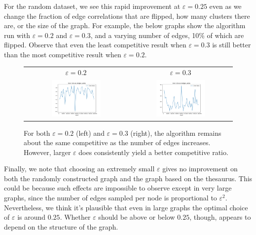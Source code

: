 \documentclass[
]{article}
\begin{document}
For the random dataset, we see this rapid improvement at
  {\(\varepsilon = 0.25\)} even as we change the fraction of edge
correlations that are flipped, how many clusters there are, or the size
of the graph. For example, the below graphs show the algorithm run with
  {\(\varepsilon = 0.2\)} and {\(\varepsilon = 0.3\)}, and a varying
number of edges, 10\% of which are flipped. Observe that even the least
competitive result when $\varepsilon = 0.3$ is still better than the most
competitive result when $\varepsilon = 0.2$.

\begin{figure}[!htb]
    \begin{tabular}{cc}
      {\(\varepsilon  = 0.2\)} & {\(\varepsilon = 0.3\)}\\
      \includegraphics[width=0.5\textwidth]{images/error_ratio_as_edges_varies_eps_equals_0.2.png}
      &
      \includegraphics[width=0.5\textwidth]{images/error_ratio_as_edges_varies_eps_equals_0.3.png}\\
    \end{tabular}
    \caption{\label{fig:error-ratio-as-edges-varies}
    For both $\varepsilon = 0.2$ (left) and $\varepsilon = 0.3$ (right), the
    algorithm remains about the same competitive as the number of edges
    increases. However, larger $\varepsilon$ does consistently yield
    a better competitive ratio.}
\end{figure}

Finally, we note that choosing an extremely small $\varepsilon$ gives no improvement
on both the randomly constructed graph and the graph based on the thesaurus. This could be
because such effects are impossible to observe except in very large graphs, since the number
of edges sampled per node is proportional to $\varepsilon^2$. Nevertheless, we think it's
plausible that even in large graphs the optimal choice of $\varepsilon$ is around $0.25$.
Whether $\varepsilon$ should be above or below $0.25$, though, appears to depend on the
structure of the graph.
\end{document}
